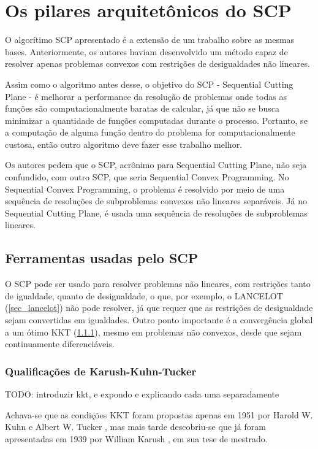 \section{Os pilares arquitetônicos do SCP}

O algorítimo SCP \cite{Still2010} apresentado é a extensão de um trabalho sobre as
mesmas bases. Anteriormente, os autores haviam desenvolvido um método capaz de resolver apenas
problemas convexos com restrições de desigualdades não lineares.

Assim como o algoritmo antes desse, o objetivo do SCP - Sequential Cutting Plane - é melhorar
a performance da resolução de problemas onde todas as funções são computacionalmente baratas
de calcular, já que não se busca minimizar a quantidade de funções computadas durante o processo.
Portanto, se a computação de alguma função dentro do problema for computacionalmente custosa, então outro
algoritmo deve fazer esse trabalho melhor.

Os autores pedem que o SCP, acrônimo para Sequential Cutting Plane, não seja confundido, com
outro SCP, que seria Sequential Convex Programming. No Sequential Convex Programming, o problema é
resolvido por meio de uma sequência de resoluções de subproblemas convexos não lineares
separáveis. Já no Sequential Cutting Plane, é usada uma sequência de resoluções de subproblemas
lineares.

\subsection{Ferramentas usadas pelo SCP}
O SCP \cite{Still2010} pode ser usado para resolver problemas não lineares, com restrições tanto
de igualdade, quanto de desigualdade, o que, por exemplo, o LANCELOT (\ref{sec_lancelot}) não pode
resolver, já que requer que as restrições de desigualdade sejam convertidas em igualdades. Outro
ponto importante é a convergência global a um ótimo KKT (\ref{sec_kkt}), mesmo em problemas não convexos, desde
que sejam continuamente diferenciáveis.

\subsubsection{Qualificações de Karush-Kuhn-Tucker}
\label{sec_kkt}

TODO: introduzir kkt, e expondo e explicando cada uma separadamente

Achava-se que as condições KKT foram propostas apenas em 1951 por Harold W. Kuhn e Albert W.
Tucker \cite{kuhn1951nonlinear}, mas mais tarde descobriu-se que já foram apresentadas em
1939 por William Karush \cite{karush1939minima}, em sua tese de mestrado.

